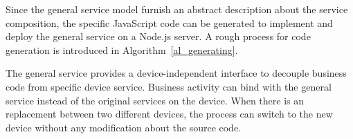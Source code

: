 Since the general service model furnish an abstract description about the service composition, the specific JavaScript code can be generated to implement and deploy the general service on a Node.js server\cite{wotframework}. A rough process for code generation is introduced in Algorithm~\ref{al_generating}. 

The general service provides a device-independent interface to decouple business code from specific device service. Business activity can bind with the general service instead of the original services on the device. When there is an replacement between two different devices, the process can switch to the new device without any modification about the source code. 



